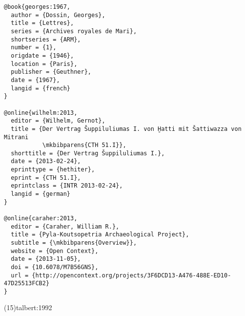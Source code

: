 \documentclass[a4paper]{article}
\begin{document}
\begin{verbatim}
@book{georges:1967,
  author = {Dossin, Georges},
  title = {Lettres},
  series = {Archives royales de Mari},
  shortseries = {ARM},
  number = {1},
  origdate = {1946},
  location = {Paris},
  publisher = {Geuthner},
  date = {1967},
  langid = {french}
}

@online{wilhelm:2013,
  editor = {Wilhelm, Gernot},
  title = {Der Vertrag Šuppiluliumas I. von Ḫatti mit Šattiwazza von Mitrani
           \mkbibparens{CTH 51.I}},
  shorttitle = {Der Vertrag Šuppiluliumas I.},
  date = {2013-02-24},
  eprinttype = {hethiter},
  eprint = {CTH 51.I},
  eprintclass = {INTR 2013-02-24},
  langid = {german}
}

@online{caraher:2013,
  editor = {Caraher, William R.},
  title = {Pyla-Koutsopetria Archaeological Project},
  subtitle = {\mkbibparens{Overview}},
  website = {Open Context},
  date = {2013-11-05},
  doi = {10.6078/M7B56GNS},
  url = {http://opencontext.org/projects/3F6DCD13-A476-488E-ED10-47D25513FCB2}
}
\end{verbatim}

\examplecite(15){talbert:1992}
\begin{verbcite}
  \nocite{wellhausen:1957, gerhardsson:1961, peterson:1993, wright:2014,
    georges:1967, wilhelm:2013, caraher:2013}
\end{verbcite}
\exampleabbreviations
\examplebibliography
{}
\end{document}
